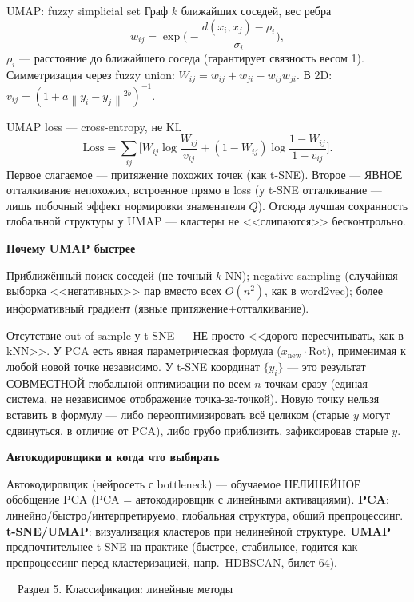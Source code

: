 \documentclass[12pt, a4paper]{article}
\newcommand{\razdel}[2]{%
  \clearpage%
  \noindent\colorbox{razdelcol}{\parbox{\dimexpr\linewidth-2\fboxsep\relax}{%
    \color{white}\LARGE\bfseries\strut\ \ Раздел #1. #2%
  }}%
  \vspace{10pt}%
}
\newcommand{\qsub}[1]{%
  \vspace{5pt}%
  {\bfseries\color{defblue} #1}%
  \par\vspace{2pt}%
}
\newcommand{\norm}[1]{\left\lVert #1 \right\rVert}
\begin{document}
\begin{defbox}{UMAP: fuzzy simplicial set}
Граф $k$ ближайших соседей, вес ребра
\[
  w_{ij} = \exp\!\Big(-\frac{d(x_i,x_j)-\rho_i}{\sigma_i}\Big),
\]
$\rho_i$ --- расстояние до ближайшего соседа (гарантирует связность весом 1). Симметризация через fuzzy union: $W_{ij} = w_{ij}+w_{ji}-w_{ij}w_{ji}$. В 2D: $v_{ij} = (1+a\norm{y_i-y_j}^{2b})^{-1}$.
\end{defbox}

\begin{propbox}{UMAP loss --- cross-entropy, не KL}
\[
  \text{Loss} = \sum_{ij}\Big[W_{ij}\log\frac{W_{ij}}{v_{ij}} + (1-W_{ij})\log\frac{1-W_{ij}}{1-v_{ij}}\Big].
\]
Первое слагаемое --- притяжение похожих точек (как t-SNE). Второе --- ЯВНОЕ отталкивание непохожих, встроенное прямо в loss (у t-SNE отталкивание --- лишь побочный эффект нормировки знаменателя $Q$). Отсюда лучшая сохранность глобальной структуры у UMAP --- кластеры не <<слипаются>> бесконтрольно.
\end{propbox}

\qsub{Почему UMAP быстрее}
Приближённый поиск соседей (не точный $k$-NN); negative sampling (случайная выборка <<негативных>> пар вместо всех $O(n^2)$, как в word2vec); более информативный градиент (явные притяжение+отталкивание).

\begin{fishkabox}
Отсутствие out-of-sample у t-SNE --- НЕ просто <<дорого пересчитывать, как в kNN>>. У PCA есть явная параметрическая формула ($x_{\text{new}}\cdot\text{Rot}$), применимая к любой новой точке независимо. У t-SNE координат $\{y_i\}$ --- это результат СОВМЕСТНОЙ глобальной оптимизации по всем $n$ точкам сразу (единая система, не независимое отображение точка-за-точкой). Новую точку нельзя вставить в формулу --- либо переоптимизировать всё целиком (старые $y$ могут сдвинуться, в отличие от PCA), либо грубо приблизить, зафиксировав старые $y$.
\end{fishkabox}

\qsub{Автокодировщики и когда что выбирать}
Автокодировщик (нейросеть с bottleneck) --- обучаемое НЕЛИНЕЙНОЕ обобщение PCA (PCA = автокодировщик с линейными активациями). \textbf{PCA}: линейно/быстро/интерпретируемо, глобальная структура, общий препроцессинг. \textbf{t-SNE/UMAP}: визуализация кластеров при нелинейной структуре. \textbf{UMAP} предпочтительнее t-SNE на практике (быстрее, стабильнее, годится как препроцессинг перед кластеризацией, напр.\ HDBSCAN, билет 64).

\razdel{5}{Классификация: линейные методы}
\end{document}
